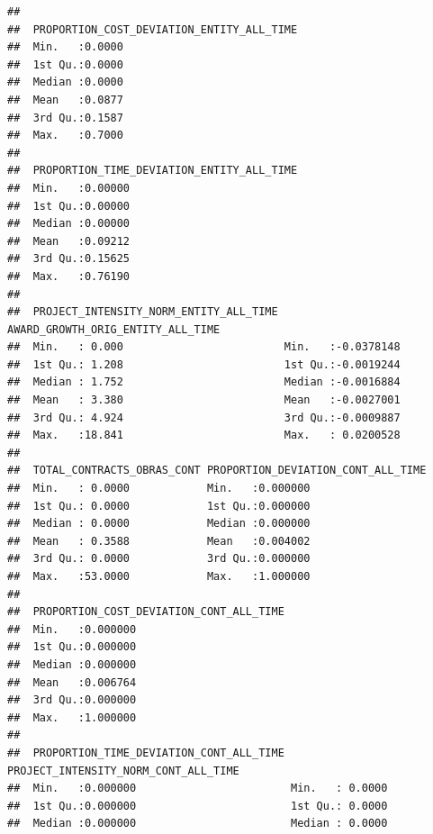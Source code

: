 \documentclass[
]{article}
\begin{document}
\begin{verbatim}
##                                                                   
##  PROPORTION_COST_DEVIATION_ENTITY_ALL_TIME
##  Min.   :0.0000                           
##  1st Qu.:0.0000                           
##  Median :0.0000                           
##  Mean   :0.0877                           
##  3rd Qu.:0.1587                           
##  Max.   :0.7000                           
##                                           
##  PROPORTION_TIME_DEVIATION_ENTITY_ALL_TIME
##  Min.   :0.00000                          
##  1st Qu.:0.00000                          
##  Median :0.00000                          
##  Mean   :0.09212                          
##  3rd Qu.:0.15625                          
##  Max.   :0.76190                          
##                                           
##  PROJECT_INTENSITY_NORM_ENTITY_ALL_TIME AWARD_GROWTH_ORIG_ENTITY_ALL_TIME
##  Min.   : 0.000                         Min.   :-0.0378148               
##  1st Qu.: 1.208                         1st Qu.:-0.0019244               
##  Median : 1.752                         Median :-0.0016884               
##  Mean   : 3.380                         Mean   :-0.0027001               
##  3rd Qu.: 4.924                         3rd Qu.:-0.0009887               
##  Max.   :18.841                         Max.   : 0.0200528               
##                                                                          
##  TOTAL_CONTRACTS_OBRAS_CONT PROPORTION_DEVIATION_CONT_ALL_TIME
##  Min.   : 0.0000            Min.   :0.000000                  
##  1st Qu.: 0.0000            1st Qu.:0.000000                  
##  Median : 0.0000            Median :0.000000                  
##  Mean   : 0.3588            Mean   :0.004002                  
##  3rd Qu.: 0.0000            3rd Qu.:0.000000                  
##  Max.   :53.0000            Max.   :1.000000                  
##                                                               
##  PROPORTION_COST_DEVIATION_CONT_ALL_TIME
##  Min.   :0.000000                       
##  1st Qu.:0.000000                       
##  Median :0.000000                       
##  Mean   :0.006764                       
##  3rd Qu.:0.000000                       
##  Max.   :1.000000                       
##                                         
##  PROPORTION_TIME_DEVIATION_CONT_ALL_TIME PROJECT_INTENSITY_NORM_CONT_ALL_TIME
##  Min.   :0.000000                        Min.   : 0.0000                     
##  1st Qu.:0.000000                        1st Qu.: 0.0000                     
##  Median :0.000000                        Median : 0.0000                     

\end{verbatim}
\end{document}
